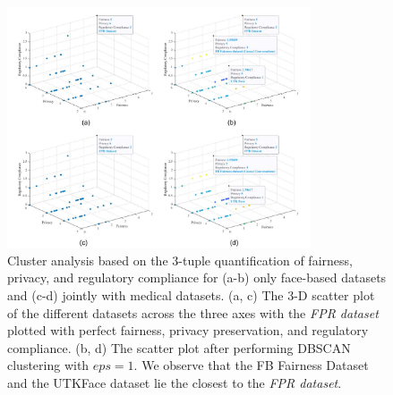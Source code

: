 \documentclass[journal]{IEEEtran}
\begin{document}
\begin{figure}[!t]
\centering
\includegraphics[width=0.8\textwidth]{images/new_cluster_analysis_wwo_medical.pdf}
\caption{Cluster analysis based on the 3-tuple quantification of fairness, privacy, and regulatory compliance for (a-b) only face-based datasets and (c-d) jointly with medical datasets. (a, c) The 3-D scatter plot of the different datasets across the three axes with the \textit{FPR dataset} plotted with perfect fairness, privacy preservation, and regulatory compliance. (b, d) The scatter plot after performing DBSCAN clustering with $eps=1$. We observe that the FB Fairness Dataset and the UTKFace dataset lie the closest to the \textit{FPR dataset}. }
\label{fig:clusteranalysis}
\end{figure}
\end{document}
